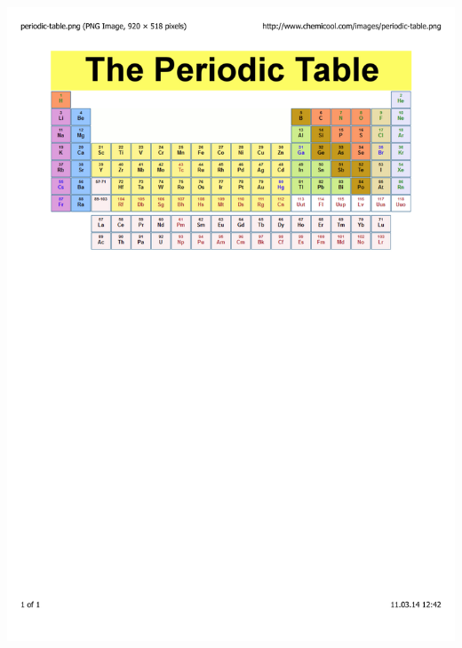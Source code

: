 \documentclass[mathserif,8pt]{beamer}
\begin{document}
\begin{frame}
\begin{columns}
\begin{column}{0.55\textwidth}
	\centering
	\includegraphics[viewport = 0 500 550 800, clip, scale=0.35]{figures/periodic_table.pdf}\\

\end{column}
\end{columns}
\end{frame}
\end{document}
